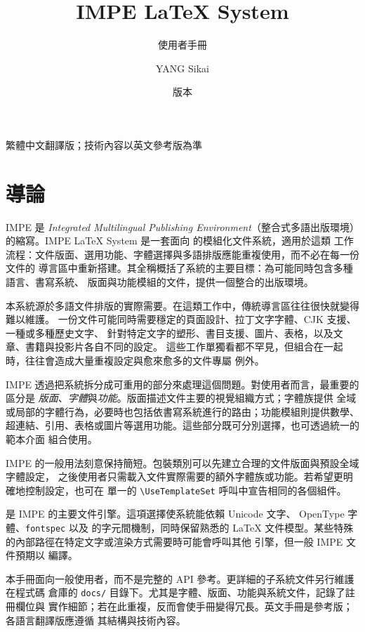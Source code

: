\documentclass[11pt]{impeart_zh}
\title{IMPE \LaTeX{} System}
\subtitle{使用者手冊}
\author{YANG Sikai}
\date{版本 \IMPEVersion}
\begin{document}
\maketitle

\begin{center}
\small 繁體中文翻譯版；技術內容以英文參考版為準
\end{center}

\tableofcontents

\section{導論}

IMPE 是 \emph{Integrated Multilingual Publishing Environment}（整合式多語出版環境）
的縮寫。IMPE \LaTeX{} System 是一套面向 \XeLaTeX{} 的模組化文件系統，適用於這類
工作流程：文件版面、選用功能、字體選擇與多語排版應能重複使用，而不必在每一份文件的
導言區中重新搭建。其全稱概括了系統的主要目標：為可能同時包含多種語言、書寫系統、
版面與功能模組的文件，提供一個整合的出版環境。

本系統源於多語文件排版的實際需要。在這類工作中，傳統導言區往往很快就變得難以維護。
一份文件可能同時需要穩定的頁面設計、拉丁文字字體、CJK 支援、一種或多種歷史文字、
針對特定文字的塑形、書目支援、圖片、表格，以及文章、書籍與投影片各自不同的設定。
這些工作單獨看都不罕見，但組合在一起時，往往會造成大量重複設定與愈來愈多的文件專屬
例外。

IMPE 透過把系統拆分成可重用的部分來處理這個問題。對使用者而言，最重要的區分是
\emph{版面}、\emph{字體}與\emph{功能}。版面描述文件主要的視覺組織方式；字體族提供
全域或局部的字體行為，必要時也包括依書寫系統進行的路由；功能模組則提供數學、
超連結、引用、表格或圖片等選用功能。這些部分既可分別選擇，也可透過統一的範本介面
組合使用。

IMPE 的一般用法刻意保持簡短。包裝類別可以先建立合理的文件版面與預設全域字體設定，
之後使用者只需載入文件實際需要的額外字體族或功能。若希望更明確地控制設定，也可在
單一的 \verb|\UseTemplateSet| 呼叫中宣告相同的各個組件。

\XeLaTeX{} 是 IMPE 的主要文件引擎。這項選擇使系統能依賴 Unicode 文字、
OpenType 字體、\texttt{fontspec} 以及 \XeTeX{} 的字元間機制，同時保留熟悉的
\LaTeX{} 文件模型。某些特殊的內部路徑在特定文字或渲染方式需要時可能會呼叫其他
引擎，但一般 IMPE 文件預期以 \XeLaTeX{} 編譯。

本手冊面向一般使用者，而不是完整的 API 參考。更詳細的子系統文件另行維護在程式碼
倉庫的 \texttt{docs/} 目錄下。尤其是字體、版面、功能與系統文件，記錄了註冊欄位與
實作細節；若在此重複，反而會使手冊變得冗長。英文手冊是參考版；各語言翻譯版應遵循
其結構與技術內容。
\end{document}
